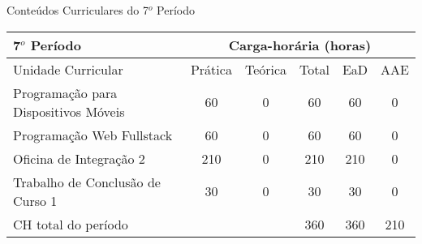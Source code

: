 \begin{quadro}[ht!]
\centering
\caption{Conteúdos Curriculares do 7$^o$ Período}\label{qua:periodo7}
\begin{tabular}{|p{8.0cm}|c|c|c|c|c|}
\hline
\rowcolor{blue1} 7$^o$ Período & \multicolumn{5}{|c|}{\centering Carga-horária (horas)} \\ \hline
\rowcolor{blue1} Unidade Curricular & Prática & Teórica & Total & EaD & AAE \\ \hline
Programação para Dispositivos Móveis & 60 & 0 & 60 & 60	&	0 \\	\hline
Programação Web Fullstack & 60 & 0 & 60 & 60	&	0 \\	\hline
Oficina de Integração 2 & 210 & 0 & 210 & 210	&	0 \\	\hline
Trabalho de Conclusão de Curso 1 & 30 & 0 & 30 & 30	&	0 \\	\hline
CH total do período & \multicolumn{2}{p{3.3cm}|}{\cellcolor{blue1}} & 360 & 360	&	210 \\ \hline
 \end{tabular} \end{quadro}